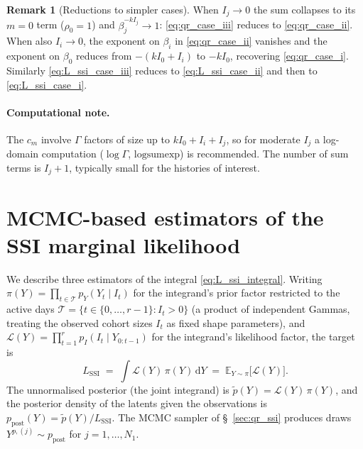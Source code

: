 \documentclass{article}
\theoremstyle{definition}
\newtheorem*{remark}{Remark}
\begin{document}
\begin{remark}[Reductions to simpler cases]
  When $I_j \to 0$ the sum collapses to its $m = 0$ term
  ($\rho_0 = 1$) and $\beta_j^{-k I_j} \to 1$: \eqref{eq:qr_case_iii}
  reduces to \eqref{eq:qr_case_ii}.  When also $I_i \to 0$, the
  exponent on $\beta_i$ in \eqref{eq:qr_case_ii} vanishes and the
  exponent on $\beta_0$ reduces from $-(k I_0 + I_i)$ to $-k I_0$,
  recovering \eqref{eq:qr_case_i}.  Similarly
  \eqref{eq:L_ssi_case_iii} reduces to
  \eqref{eq:L_ssi_case_ii} and then to \eqref{eq:L_ssi_case_i}.
\end{remark}

\paragraph{Computational note.}
The $c_m$ involve $\Gamma$ factors of size up to
$k I_0 + I_i + I_j$, so for moderate $I_j$ a log-domain computation
($\log\Gamma$, $\mathrm{logsumexp}$) is recommended.  The number of
sum terms is $I_j + 1$, typically small for the histories of interest.

\section{MCMC-based estimators of the SSI marginal likelihood}
\label{sec:mcmc_evidence}

We describe three estimators of the integral
\eqref{eq:L_ssi_integral}.  Writing
$\pi(Y) = \prod_{t \in \mathcal T} p_Y(Y_t \mid I_t)$
for the integrand's prior factor restricted to the active days
$\mathcal{T} = \{t \in \{0,\ldots,r-1\} : I_t > 0\}$ (a product of
  independent Gammas, treating the observed cohort sizes $I_t$ as fixed
shape parameters), and
$\mathcal L(Y) = \prod_{t=1}^{r} p_I(I_t \mid Y_{0:t-1})$
for the integrand's likelihood factor, the target is
\begin{equation}\label{eq:L_def}
  L_\mathrm{SSI}
  \;=\; \int \mathcal L(Y)\, \pi(Y)\, \mathrm{d}Y
  \;=\; \mathbb E_{Y \sim \pi}\!\bigl[\mathcal L(Y)\bigr].
\end{equation}
The unnormalised posterior (the joint integrand) is
$\tilde p(Y) = \mathcal L(Y)\, \pi(Y)$, and the posterior density of the
latents given the observations is
$p_\mathrm{post}(Y) = \tilde p(Y) / L_\mathrm{SSI}$.  The MCMC sampler of
\S~\ref{sec:qr_ssi} produces draws $Y^{p,(j)} \sim p_\mathrm{post}$ for
$j = 1, \ldots, N_1$.
\end{document}
